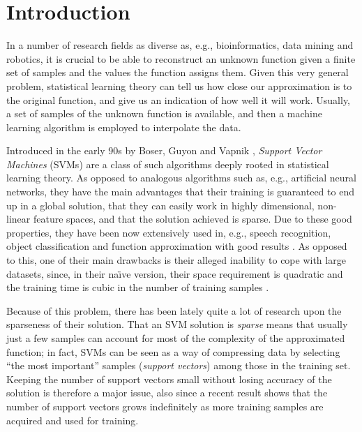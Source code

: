 \documentclass[10pt,twocolumn,letterpaper]{article}
\begin{document}

\section{Introduction}

In a number of research fields as diverse as, e.g., bioinformatics,
data mining and robotics, it is crucial to be able to reconstruct an
unknown function given a finite set of samples and the values the
function assigns them. Given this very general problem, statistical
learning theory \cite{v-edbed-82} can tell us how close our
approximation is to the original function, and give us an indication
of how well it will work. Usually, a set of samples of the unknown
function is available, and then a machine learning algorithm is
employed to interpolate the data.

Introduced in the early 90s by Boser, Guyon and Vapnik \cite{BGV92},
\emph{Support Vector Machines} (SVMs) are a class of such algorithms
deeply rooted in statistical learning theory. As opposed to analogous
algorithms such as, e.g., artificial neural networks, they have the
main advantages that their training is guaranteed to end up in a
global solution, that they can easily work in highly dimensional,
non-linear feature spaces, and that the solution achieved is
sparse. Due to these good properties, they have been now extensively
used in, e.g., speech recognition, object classification and function
approximation with good results \cite{Cristianini00}. As opposed to
this, one of their main drawbacks is their alleged inability to cope
with large datasets, since, in their na\"\i ve version, their space
requirement is quadratic and the training time is cubic in the number
of training samples \cite{KeerthiCDC06}.

Because of this problem, there has been lately quite a lot of research
upon the sparseness of their solution. That an SVM solution is
\emph{sparse} means that usually just a few samples can account for
most of the complexity of the approximated function; in fact, SVMs can
be seen as a way of compressing data by selecting ``the most
important'' samples (\emph{support vectors}) among those in the
training set. Keeping the number of support vectors small without
losing accuracy of the solution is therefore a major issue, also since
a recent result \cite{Steinwart03} shows that the number of support
vectors grows indefinitely as more training samples are acquired and
used for training.
\end{document}
